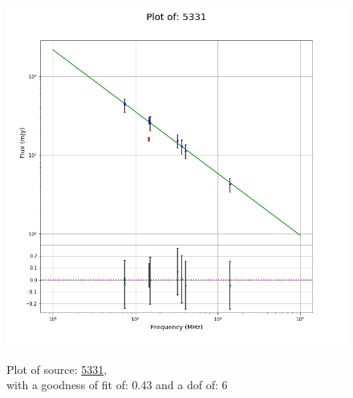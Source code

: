 \documentclass{article}
\begin{document}
\begin{figure}[H]
\begin{minipage}{0.5\textwidth}
        \includegraphics[scale = 0.35]{KmeulenSimSource_1hr/1hr5331.png}
        \captionsetup{labelformat=empty}
        \caption{Plot of source: \href{http://banana.transientskp.org/r4/vlo_KmeulenSimSource/runningcatalog/5331}{5331},\\with a goodness of fit of: 0.43 and a dof of: 6}
    \addtocounter{figure}{-1}
    \label{KmeulenSimSource:1hr:5331:plot}
    \end{minipage}
\end{figure}
\end{document}
